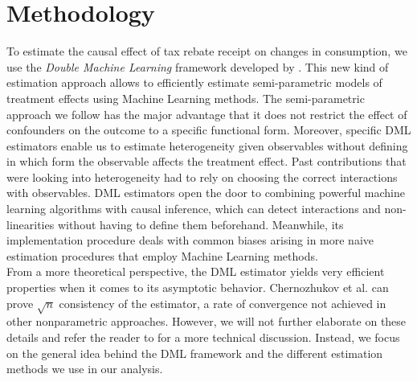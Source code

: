 \section{Methodology} \label{sec:methodology}
To estimate the causal effect of tax rebate receipt on changes in consumption, we use the \textit{Double Machine Learning} framework developed by \cite{DML2017}. This new kind of estimation approach allows to efficiently estimate semi-parametric models of treatment effects using Machine Learning methods. The semi-parametric approach we follow has the major advantage that it does not restrict the effect of confounders on the outcome to a specific functional form. Moreover, specific DML estimators enable us to estimate heterogeneity given observables without defining in which form the observable affects the treatment effect. Past contributions that were looking into heterogeneity had to rely on choosing the correct interactions with observables. DML estimators open the door to combining powerful machine learning algorithms with causal inference, which can detect interactions and non-linearities without having to define them beforehand. Meanwhile, its implementation procedure deals with common biases arising in more naive estimation procedures that employ Machine Learning methods. \\
From a more theoretical perspective, the DML estimator yields very efficient properties when it comes to its asymptotic behavior. Chernozhukov et al. can prove $\sqrt{n}$ consistency of the estimator, a rate of convergence not achieved in other nonparametric approaches. However, we will not further elaborate on these details and refer the reader to \cite{DML2017} for a more technical discussion. Instead, we focus on the general idea behind the DML framework and the different estimation methods we use in our analysis.

